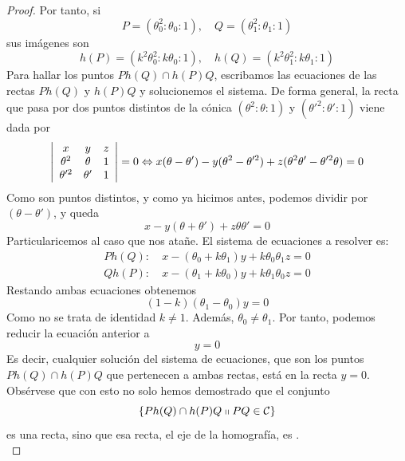 \begin{proof}
	Por tanto, si 
	\[P=(\theta_0^2:\theta_0:1),\quad Q=(\theta_1^2:\theta_1:1)\]
	sus imágenes son
	\[h(P)=(k^2\theta_0^2:k\theta_0:1),\quad h(Q)=(k^2\theta_1^2:k\theta_1:1)\]
	Para hallar los puntos $Ph(Q)\cap h(P)Q$, escribamos las ecuaciones de las rectas $Ph(Q)$ y $h(P)Q$ y solucionemos el sistema. De forma general, la recta que pasa por dos puntos distintos de la cónica $(\theta^2:\theta:1)$ y $(\theta'^2:\theta':1)$ viene dada por 
	\[\left| \begin{array}{ccc}
	x&y&z\\
	\theta^2&\theta&1\\
	\theta'^2&\theta'&1
	\end{array}\right| =0\Leftrightarrow x(\theta-\theta')-y(\theta^2-\theta'^2)+z(\theta^2\theta'-\theta'^2\theta)=0\]
	Como son puntos distintos, y como ya hicimos antes, podemos dividir por $(\theta-\theta')$, y queda
	\begin{equation}\label{C8_eq_teo_eje}
		x -y(\theta+\theta')+z\theta\theta'=0
	\end{equation}
	Particularicemos al caso que nos atañe. El sistema de ecuaciones a resolver es:
	\begin{equation*}
		\begin{split}
			Ph(Q):& \ x-(\theta_0+k\theta_1)y+k\theta_0\theta_1z=0\\
			Qh(P):& \ x-(\theta_1+k\theta_0)y+k\theta_1\theta_0z=0
		\end{split}
	\end{equation*}
	Restando ambas ecuaciones obtenemos
	\[(1-k)(\theta_1-\theta_0)y=0\]
	Como no se trata de identidad $k\not=1$. Además, $\theta_0\not=\theta_1$. Por tanto, podemos reducir la ecuación anterior a
	\[y=0\]
	Es decir, cualquier solución del sistema de ecuaciones, que son los puntos $Ph(Q)\cap h(P)Q$ que pertenecen a ambas rectas, está en la recta $y=0$. Obsérvese que con esto no solo hemos demostrado que el conjunto
	\[\{Ph(Q)\cap h(P)Q\shortparallel PQ\in\mathcal{C}\}\]
	es una recta, sino que esa recta, el eje de la homografía, es .\\
	

\end{proof}
